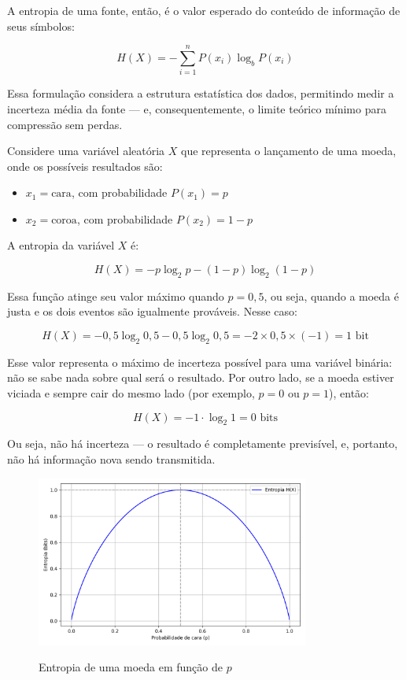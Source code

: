 A entropia de uma fonte, então, é o valor esperado do conteúdo de informação de seus símbolos:

\[
H(X) = - \sum_{i=1}^{n} P(x_i) \log_b P(x_i)
\]

Essa formulação considera a estrutura estatística dos dados, permitindo medir a incerteza média da fonte — e, consequentemente, o limite teórico mínimo para compressão sem perdas.

Considere uma variável aleatória \( X \) que representa o lançamento de uma moeda, onde os possíveis resultados são:

\begin{itemize}
    \item \( x_1 = \text{cara} \), com probabilidade \( P(x_1) = p \)
    \item \( x_2 = \text{coroa} \), com probabilidade \( P(x_2) = 1 - p \)
\end{itemize}

A entropia da variável \( X \) é:

\[
H(X) = -p \log_2 p - (1 - p) \log_2 (1 - p)
\]

Essa função atinge seu valor máximo quando \( p = 0{,}5 \), ou seja, quando a moeda é justa e os dois eventos são igualmente prováveis. Nesse caso:

\[
H(X) = -0{,}5 \log_2 0{,}5 - 0{,}5 \log_2 0{,}5 = -2 \times 0{,}5 \times (-1) = 1 \text{ bit}
\]

Esse valor representa o máximo de incerteza possível para uma variável binária: não se sabe nada sobre qual será o resultado. Por outro lado, se a moeda estiver viciada e sempre cair do mesmo lado (por exemplo, \( p = 0 \) ou \( p = 1 \)), então:

\[
H(X) = -1 \cdot \log_2 1 = 0 \text{ bits}
\]

Ou seja, não há incerteza — o resultado é completamente previsível, e, portanto, não há informação nova sendo transmitida.

\begin{figure}[htbp]
    \caption{\small Entropia de uma moeda em função de \(p\)}
    \centering
    \includegraphics[width=0.8\textwidth]{figs/entropia-moeda.png}
    \label{fig:entropia-moeda}
\end{figure}

